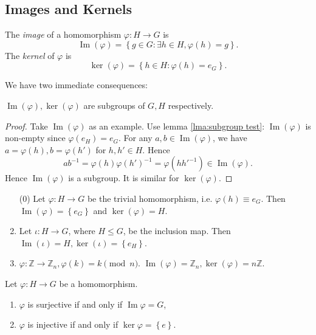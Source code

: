\documentclass[10pt]{article}
\DeclareMathOperator{\im}{Im}
\def\le{\leqslant}
\begin{document}
    \subsection{Images and Kernels}
    \begin{definition}
        The \textit{image} of a homomorphism $ \varphi: H \to G $ is 
        \[
            \operatorname{Im}(\varphi)=\left\{ g\in G: \exists h\in H, \varphi(h)=g \right\}
        .\]
        The \textit{kernel} of $ \varphi $ is 
        \[
            \ker(\varphi)=\left\{ h\in H: \varphi(h)=e_G \right\}
        .\]
    \end{definition}
    We have two immediate consequences:
    \begin{proposition}\label{prop:ker, im are groups}
        $ \operatorname{Im}(\varphi), \ker (\varphi)  $ are subgroups of $G,H$ respectively.
    \end{proposition}
    \begin{proof}
        Take $ \operatorname{Im}(\varphi) $ as an example. Use lemma \ref{lma:subgroup test}: $ \operatorname{Im}(\varphi)  $ is non-empty since $ \varphi(e_H)=e_G $. For any $ a,b\in \operatorname{Im}(\varphi)  $, we have $ a=\varphi(h), b=\varphi(h') $ for $h,h'\in H$. Hence
        \[
            ab^{-1}=\varphi(h)\varphi(h')^{-1}=\varphi(hh'^{-1})\in \operatorname{Im}(\varphi) 
        .\]
        Hence $ \operatorname{Im}(\varphi)  $ is a subgroup. It is similar for $ \ker (\varphi) $.
    \end{proof}
    \begin{example}
        \begin{enumerate}[(1)]
            \item[(0)] Let $ \varphi:H\to G $ be the trivial homomorphism, i.e. $ \varphi(h)\equiv e_G $. Then $ \im(\varphi)=\left\{ e_G\right\} $ and $ \ker (\varphi)=H $.
            \item Let $ \iota: H\to G $, where $H\le G$, be the inclusion map. Then $ \im (\iota) = H, \ker (\iota) = \left\{ e_H\right\} $.
            \item $ \varphi: \mathbb{Z} \to \mathbb{Z}_n, \varphi(k)=k \pmod n $. $ \im (\varphi)=\mathbb{Z}_n, \ker (\varphi)= n \mathbb{Z}$.
        \end{enumerate}
    \end{example}
    \begin{proposition}\label{prop:homom surj}
        Let $ \varphi:H\to G $ be a homomorphism.
        \begin{enumerate}[(1)]
            \item $ \varphi $ is surjective if and only if $ \im \varphi = G $,
            \item $ \varphi $ is injective if and only if $ \ker \varphi = \left\{ e\right\} $.
        \end{enumerate}
    \end{proposition}
\end{document}
